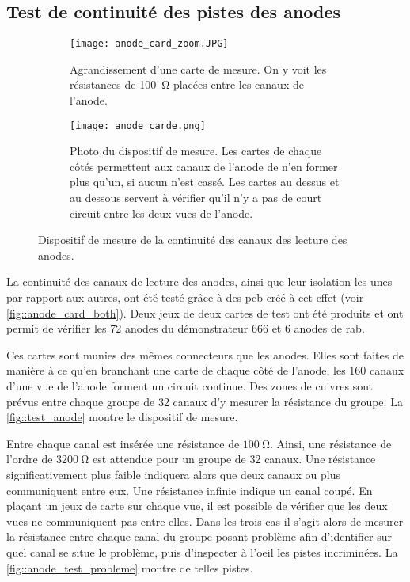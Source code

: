        \subsection{Test de continuité des pistes des anodes}\label{sec::test_anode}
            \begin{figure}
                \begin{subfigure}[t]{0.48\textwidth}
                    \texttt{[image: anode\_card\_zoom.JPG]}
                    \caption{Agrandissement d'une carte de mesure. On y voit les résistances de \SI{100}{\ohm} placées entre les canaux de l'anode.}
                    \label{fig::anode_card_zoom}
                \end{subfigure}
                \hfill
                \begin{subfigure}[t]{0.48\textwidth}
                    \texttt{[image: anode\_carde.png]}
                    \caption{Photo du dispositif de mesure. Les cartes de chaque côtés permettent aux  canaux de l'anode de n'en former plus qu'un, si aucun n'est cassé. Les cartes au dessus et au dessous servent à vérifier qu'il n'y a pas de court circuit entre les deux vues de l'anode.}
                    \label{fig::anode_card}
                \end{subfigure}
                \caption[Dispositif de mesure de la continuité des canaux des lecture des anodes.]{Dispositif de mesure de la continuité des canaux des lecture des anodes.}
                \label{fig::test_anode}
            \end{figure}
            La continuité des canaux de lecture des anodes, ainsi que leur isolation les unes par rapport aux autres, ont été testé grâce à des \gls{pcb} créé à cet effet (voir \autoref{fig::anode_card_both}). Deux jeux de deux cartes de test ont été produits et ont permit de vérifier les 72 anodes du démonstrateur 666 et 6 anodes de rab.
            
            Ces cartes sont munies des mêmes connecteurs que les anodes. Elles sont faites de manière à ce qu'en branchant une carte de chaque côté de l'anode, les 160 canaux d'une vue de l'anode forment un circuit continue. Des zones de cuivres sont prévus entre chaque groupe de 32 canaux d'y mesurer la résistance du groupe. La \autoref{fig::test_anode} montre le dispositif de mesure.

            Entre chaque canal est insérée une résistance de $\SI{100}{\ohm}$. Ainsi, une résistance de l'ordre de $\SI{3200}{\ohm}$ est attendue pour un groupe de 32 canaux. Une résistance significativement plus faible indiquera alors que deux canaux ou plus communiquent entre eux. Une résistance infinie indique un canal coupé. En plaçant un jeux de carte sur chaque vue, il est possible de vérifier que les deux vues ne communiquent pas entre elles. Dans les trois cas il s'agit alors de mesurer la résistance entre chaque canal du groupe posant problème afin d'identifier sur quel canal se situe le problème, puis d'inspecter à l'oeil les pistes incriminées. La \autoref{fig::anode_test_probleme} montre de telles pistes.

